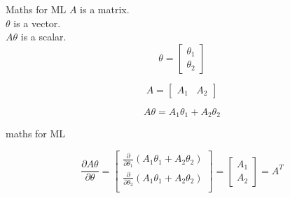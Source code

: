 \documentclass{beamer}
\begin{document}
\begin{frame}{Maths for ML}
  $A$ is a matrix.\\
  $\theta$ is a vector.\\
  $A\theta$ is a scalar.\\
  
  \begin{equation*}
      \theta = \begin{bmatrix}
      \theta_{1}\\
      \theta_{2}
      \end{bmatrix}
  \end{equation*}
  
    \begin{equation*}
      A = \begin{bmatrix}
      A_{1}& A_{2}
      \end{bmatrix}
  \end{equation*}
  
    \begin{equation*}
      A\theta = 
      A_{1}\theta_{1}+A_{2}\theta_{2}
      
  \end{equation*}
  
\end{frame}

\begin{frame}{maths for ML}

\begin{equation*}
    \frac{\partial A\theta}{\partial \theta} = \begin{bmatrix}
    \frac{\partial}{\partial \theta_{1} }(A_{1}\theta_{1}+A_{2}\theta_{2}) \\
    \frac{\partial}{\partial \theta_{2} }(A_{1}\theta_{1}+A_{2}\theta_{2}) \\
    \end{bmatrix}
    = \begin{bmatrix}
    A_{1}\\A_{2}
    \end{bmatrix}
     = A^{T}
\end{equation*}
    
\end{frame}
\end{document}
